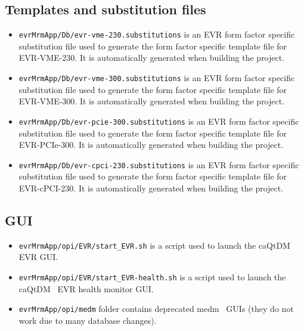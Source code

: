 \documentclass[12pt,a4paper]{article}
\begin{document}
\subsection{Templates and substitution files}\label{sec:mrfioc2 organization:substitution}
\begin{itemize}
\item 
	\texttt{evrMrmApp/Db/evr-vme-230.substitutions} is an EVR form factor specific substitution file used to generate the form factor specific template file for EVR-VME-230. It is automatically generated when building the project.
\item 
	\texttt{evrMrmApp/Db/evr-vme-300.substitutions} is an EVR form factor specific substitution file used to generate the form factor specific template file for EVR-VME-300. It is automatically generated when building the project.
\item 
	\texttt{evrMrmApp/Db/evr-pcie-300.substitutions} is an EVR form factor specific substitution file used to generate the form factor specific template file for EVR-PCIe-300. It is automatically generated when building the project.
\item 
	\texttt{evrMrmApp/Db/evr-cpci-230.substitutions} is an EVR form factor specific substitution file used to generate the form factor specific template file for EVR-cPCI-230. It is automatically generated when building the project.
\end{itemize}

\subsection{GUI}\label{sec:mrfioc2 organization:gui}
\begin{itemize}
\item 
	\texttt{evrMrmApp/opi/EVR/start\_EVR.sh} is a script used to launch the caQtDM~\cite{caqtdm} EVR GUI.
\item 
	\texttt{evrMrmApp/opi/EVR/start\_EVR-health.sh} is a script used to launch the caQtDM~\cite{caqtdm} EVR health monitor GUI.
\item 
	\texttt{evrMrmApp/opi/medm} folder contains deprecated medm~\cite{medm} GUIs (they do not work due to many database changes).
\end{itemize}
\end{document}
